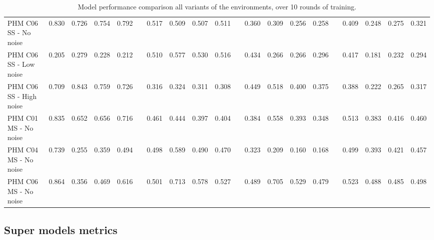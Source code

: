 \documentclass[a4paper, 12pt]{article}
\begin{document}
\begin{landscape}
\begin{table}
\begin{tabular}{@{}l rrrr c rrrr c rrrr c rrrr@{}}
			PHM C06 SS - No noise &0.830 &0.726 &0.754 & 0.792 & & 0.517 &0.509 &0.507 &0.511 & &0.360 &0.309 &0.256 &0.258 & &0.409 &0.248 &0.275&0.321\\
			PHM C06 SS - Low noise &0.205 &0.279 &0.228 & 0.212 & & 0.510 &0.577 &0.530 &0.516 & &0.434 &0.266 &0.266 &0.296 & &0.417 &0.181 &0.232&0.294\\
			PHM C06 SS - High noise &0.709 &0.843 &0.759 & 0.726 & & 0.316 &0.324 &0.311 &0.308 & &0.449 &0.518 &0.400 &0.375 & &0.388 &0.222 &0.265&0.317\\ \midrule
			
			PHM C01 MS - No noise &0.835 &0.652 &0.656 & 0.716 & & 0.461 &0.444 &0.397 &0.404 & &0.384 &0.558 &0.393 &0.348 & &0.513 &0.383 &0.416&0.460\\
			PHM C04 MS - No noise &0.739 &0.255 &0.359 & 0.494 & & 0.498 &0.589 &0.490 &0.470 & &0.323 &0.209 &0.160 &0.168 & &0.499 &0.393 &0.421&0.457\\
			PHM C06 MS - No noise &0.864 &0.356 &0.469 & 0.616 & & 0.501 &0.713 &0.578 &0.527 & &0.489 &0.705 &0.529 &0.479 & &0.523 &0.488 &0.485&0.498\\
			
			\bottomrule
		\end{tabular}
		\caption{Model performance comparison all variants of the environments, over 10 rounds of training.}
		\label{tbl:DetailedMetrics}
	\end{table}
\end{landscape}
\restoregeometry %


\subsection{Super models metrics}
\end{document}
